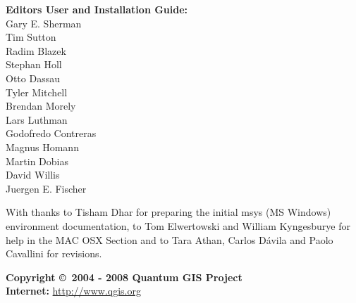 \begin{flushleft}
\textbf{Editors User and Installation Guide:} 
\\ Gary E. Sherman 
\\ Tim Sutton 
\\ Radim Blazek 
\\ Stephan Holl 
\\ Otto Dassau 
\\ Tyler Mitchell 
\\ Brendan Morely 
\\ Lars Luthman 
\\ Godofredo Contreras 
\\ Magnus Homann
\\ Martin Dobias
\\ David Willis
\\ Juergen E. Fischer

With thanks to Tisham Dhar for preparing the initial msys (MS Windows)
environment documentation, to Tom Elwertowski and William Kyngesburye for
help  in the MAC OSX Section and to Tara Athan, Carlos D\'{a}vila and Paolo
Cavallini for revisions.

\textbf{Copyright \copyright~2004 - 2008 Quantum GIS Project} \\
\textbf{Internet:} \url{http://www.qgis.org}
\end{flushleft}


